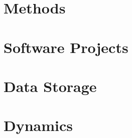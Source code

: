 \documentclass[12pt, a4paper]{report}
\begin{document}
\chapter{Methods} \label{sec:Methods}







\printbibliography{}

\begin{appendices}
  \chapter{Software Projects}
  

  \chapter{Data Storage}
  

  \chapter{Dynamics}
  

\end{appendices}
\end{document}
